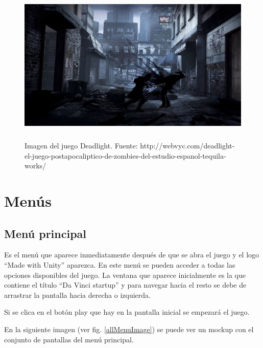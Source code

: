 \begin{figure}
    \begin{center}
    \includegraphics[width=5.30458in,height=2.98414in]{anexos/GDD/GDD-img001.jpg} 
    \caption{Imagen del juego Deadlight. Fuente: http://webvyc.com/deadlight-el-juego-postapocaliptico-de-zombies-del-estudio-espanol-tequila-works/}
    \label{deadlightImage}
    \end{center}
\end{figure}


\section[Men\'us]{ Men\'us}
\label{guionTecnico}
\hypertarget{Toc484614215}{}\subsection[Men\'u principal]{ Men\'u principal}
\hypertarget{Toc484614216}{}{
Es el men\'u que aparece inmediatamente despu\'es de que se abra el juego y el logo ``Made with Unity'' aparezca. En
este men\'u se pueden acceder a todas las opciones disponibles del juego. La ventana que aparece inicialmente es la que
contiene el t\'itulo ``Da Vinci startup'' y para navegar hacia el resto se debe de arrastrar la pantalla hacia derecha
o izquierda.\ }

{
Si se clica en el bot\'on play que hay en la pantalla inicial se empezar\'a el juego. 


En la siguiente imagen (ver fig. \ref{allMenuImage}) se puede ver un mockup con el conjunto de pantallas del men\'u principal.}


\bigskip

